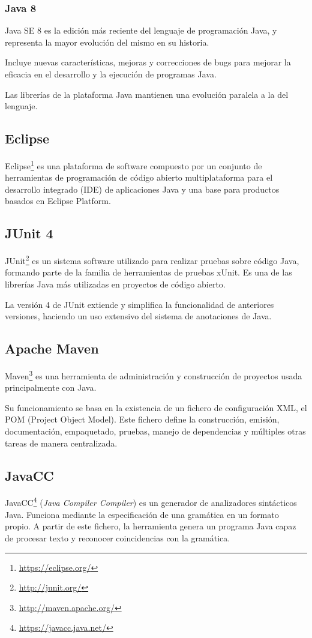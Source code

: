 \subsubsection{Java 8}
Java SE 8 es la edición más reciente del lenguaje de programación Java, y representa la mayor evolución del mismo en su historia.

 Incluye nuevas características, mejoras y correcciones de bugs para mejorar la eficacia en el desarrollo y la ejecución de programas Java. 
 
 Las librerías de la plataforma Java mantienen una evolución paralela a la del lenguaje.
\subsection{Eclipse}
Eclipse\footnote{\url{https://eclipse.org/}} es una plataforma de software compuesto por un conjunto de herramientas de programación de código abierto multiplataforma para el desarrollo integrado (IDE) de aplicaciones Java  y una base para productos basados en Eclipse Platform.


\subsection{JUnit 4}
JUnit\footnote{\url{http://junit.org/}} es un sistema software utilizado para realizar pruebas sobre código Java, formando parte de la familia de herramientas de pruebas xUnit.
Es una de las librerías Java más utilizadas en proyectos de código abierto.

La versión 4 de JUnit extiende y simplifica la funcionalidad de anteriores versiones, haciendo un uso extensivo del sistema de anotaciones de Java.
\subsection{Apache Maven}
Maven\footnote{\url{http://maven.apache.org/}} es una herramienta de administración y construcción de proyectos usada principalmente con Java.

Su funcionamiento se basa en la existencia de un fichero de configuración XML, el POM (Project Object Model).
Este fichero define la construcción, emisión, documentación, empaquetado, pruebas, manejo de dependencias y múltiples otras tareas de manera centralizada.
\subsection{JavaCC}
JavaCC\footnote{\url{https://javacc.java.net/}} (\emph{Java Compiler Compiler}) es un generador de analizadores sintácticos Java.
Funciona mediante la especificación de una gramática en un formato propio.
A partir de este fichero, la herramienta genera un programa Java capaz de procesar texto y reconocer coincidencias con la gramática.

